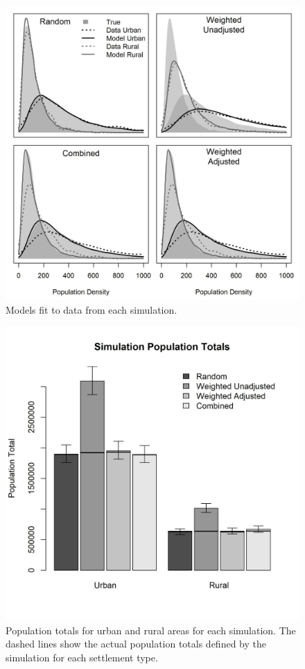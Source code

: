 \documentclass[9pt,twocolumn,twoside,lineno]{pnas-new}
\begin{document}
\begin{figure}
	\centering
	\includegraphics[width=1\linewidth]{figs/sim_model.jpg}
	\caption{Models fit to data from each simulation.}
	\label{fig:sim_model}
\end{figure}

\begin{figure}
	\centering
	\includegraphics[width=1\linewidth]{figs/sim_totals.jpg}
	\caption{Population totals for urban and rural areas for each simulation. The dashed lines show the actual population totals defined by the simulation for each settlement type.}
	\label{fig:sim_totals}
\end{figure}
\end{document}

